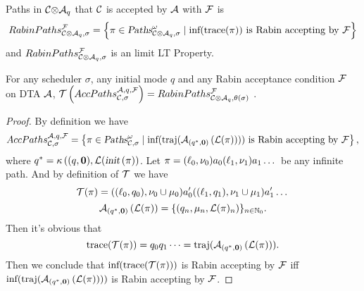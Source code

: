 
Paths in ${\mathcal{C}}{\otimes}{\mathcal{A}_q}$ that $\mathcal{C}$ is accepted by $\mathcal{A}$ with $\mathcal{F}$ is
$$
    RabinPaths _{ {\mathcal{C}}{\otimes}{\mathcal{A}_q}, \sigma } ^{\mathcal{F}} = \left \{ 
        \pi \in \mbox{\sl Paths}^\omega_{{\mathcal{C}}{\otimes}{\mathcal{A}_q},\sigma} \mid 
        \mbox{inf} (  
            \mbox{trace}(  
                \pi
             )
         )
        \mbox{ is Rabin accepting by } \mathcal{F}
    \right\}
$$
and $RabinPaths _{ {\mathcal{C}}{\otimes}{\mathcal{A}_q}, \sigma } ^{\mathcal{F}}$ is an limit LT Property.

\vspace{-0.8em}
\begin{proposition}\label{prop:psfunc} 
For any scheduler $\sigma$, any initial mode $q$ and any Rabin acceptance condition
$\mathcal{F}$ on DTA $\mathcal{A}$, $\mathcal{T}\left( AccPaths _{\mathcal{C},\sigma} ^{\mathcal{A},q,\mathcal{F}} \right) = RabinPaths _{ {\mathcal{C}}{\otimes}{\mathcal{A}_q}, \theta \left( \sigma \right) } ^{\mathcal{F}}$ .
\end{proposition}

\begin{proof}
By definition we have
$$
    AccPaths _{\mathcal{C},\sigma} ^{\mathcal{A},q,\mathcal{F}} = \left \{ 
        \pi \in \mbox{\sl Paths}^\omega_{\mathcal{C},\sigma} \mid 
        \mbox{inf} (  
            \mbox{traj} (  
                {\mathcal{A}}_{\left(q^*,\mathbf{0}\right)}\left(\mathcal{L}(\pi)\right) 
             )
         )
        \mbox{ is Rabin accepting by } \mathcal{F} 
    \right\},
$$
where
$
    q^*
        =
            \kappa \left(
                (q,\mathbf{0}), 
                \mathcal{L} (
                    \mbox{\sl init}\left(\pi\right)
            \right)
$.
Let $\pi = (\ell_0,\nu_0) a_0 (\ell_1,\nu_1) a_1 \dots $ be any infinite path.
And by definition of $\mathcal{T}$ we have
$$
    \mathcal{T}( \pi ) = 
        ((\ell_0,q_0),\nu_0\cup\mu_0)
        a'_0
        ((\ell_1,q_1),\nu_1\cup\mu_1)
        a'_1
        \dots 
$$
$$
    {\mathcal{A}}_{\left(q^*,\mathbf{0}\right)}\left(\mathcal{L}(\pi)\right) 
        = \{(q_n,\mu_n,\mathcal{L}(\pi)_{n})\}_{n\in\mathbb{N}_0}.
$$
Then it's obvious that
$$\mbox{trace}(  \mathcal{T}( \pi )  )
    = q_0 q_1 \dots
    = \mbox{traj} (  
        {\mathcal{A}}_{\left(q^*,\mathbf{0}\right)}\left(\mathcal{L}(\pi)\right) 
     ).
$$ 
Then we conclude that
$\mbox{inf} ( 
    \mbox{trace}( 
        \mathcal{T}( \pi )
     )
 )$
is Rabin accepting by $\mathcal{F}$ iff 
$
    \mbox{inf} (  
        \mbox{traj} (  
            {\mathcal{A}}_{\left(q^*,\mathbf{0}\right)}\left(\mathcal{L}(\pi)\right) 
         )
     )
$
is Rabin accepting by $\mathcal{F}$.
\end{proof}

